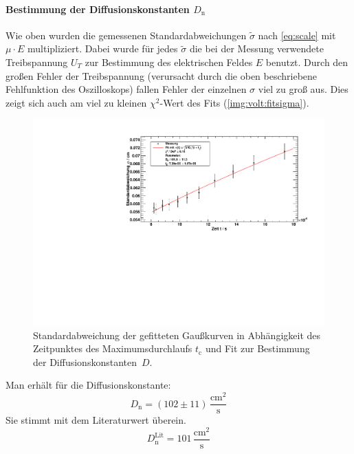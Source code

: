 \paragraph{Bestimmung der Diffusionskonstanten $D_\text{n}$}
Wie oben wurden die gemessenen Standardabweichungen $\tilde{\sigma}$ nach \autoref{eq:scale} mit $\mu \cdot E$ multipliziert. Dabei 
wurde für jedes $\tilde{\sigma}$ die bei der Messung verwendete Treibspannung $U_T$ zur Bestimmung des elektrischen Feldes $E$ benutzt. 
Durch den großen Fehler der Treibspannung (verursacht durch die oben beschriebene Fehlfunktion des Oszilloskops) fallen Fehler der einzelnen 
$\sigma$ viel zu groß aus. Dies zeigt sich auch am viel zu kleinen $\chi^2$-Wert des Fits (\autoref{img:volt:fitsigma}).
\begin{figure}[H]
\begin{center}
  \includegraphics[width=\textwidth]{../img/part2/volt_fitSigma.pdf}
  \caption{Standardabweichung der gefitteten Gaußkurven in Abhängigkeit des Zeitpunktes des Maximumsdurchlaufs $t{_\text{c}}$
  und Fit zur Bestimmung der Diffusionskonstanten~$D$.}
  \label{img:volt:fitsigma}
\end{center}
\end{figure}
Man erhält für die Diffusionskonstante:
\begin{equation}
  D_\text{n} = (102 \pm 11)\,\frac{\text{cm}^2}{\text{s}}
\end{equation}
Sie stimmt mit dem Literaturwert überein.
\begin{equation}
  D_\text{n}^{\text{Lit}} = 101\,\frac{\text{cm}^2}{\text{s}} 
\end{equation}

